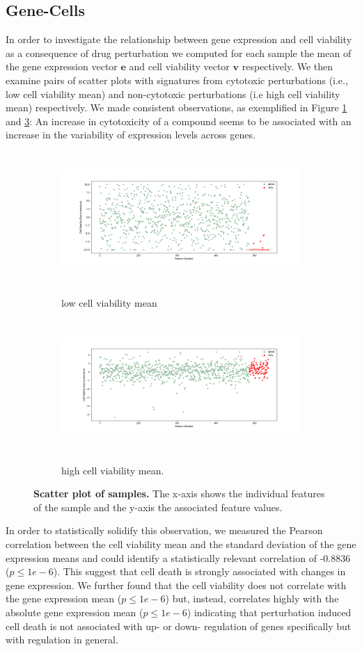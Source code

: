 \documentclass[bsc,frontabs,twoside,singlespacing,parskip,deptreport]{infthesis}     %
\let\Oldsubsection\subsection
\renewcommand{\subsection}{\FloatBarrier\Oldsubsection}
\begin{document}
\subsection{Gene-Cells}
In order to investigate the relationship between gene expression and cell viability as a consequence of drug perturbation we computed for each sample the mean of the gene expression vector \(\mathbf{e}\) and cell viability vector \(\mathbf{v}\) respectively. We then examine pairs of scatter plots with signatures from cytotoxic perturbations (i.e., low cell viability mean) and non-cytotoxic perturbations (i.e high cell viability mean) respectively. We made consistent observations, as exemplified in Figure \ref{low_mean} and \ref{high_mean}: An increase in cytotoxicity of a compound  seems to be associated with an increase in the variability of expression levels across genes.
\begin{figure}[h!]
\centering
\begin{subfigure}{1\textwidth}
 \centering
\caption{low cell viability mean}
\includegraphics[height=5cm]{images/low_cell_mean.png}\label{low_mean}
\end{subfigure}
\begin{subfigure}{1\textwidth}
\centering
\caption{high cell viability mean.}
\includegraphics[height=5cm]{images/high_cell_mean.png}\label{high_mean}
\end{subfigure}
\caption{\textbf{Scatter plot of samples.} The x-axis shows the individual features of the sample and the y-axis the associated feature values.}
\end{figure}
\clearpage
In order to statistically solidify this observation, we  measured the Pearson correlation between the cell viability mean and the standard deviation of the gene expression means and could identify a statistically relevant correlation of -0.8836 (\(p\leq1e-6\)). This suggest that cell death is strongly associated with changes in gene expression.
We further found that the cell viability does not correlate with the gene expression mean (\(p\leq1e-6\)) but, instead, correlates highly with the absolute gene expression mean (\(p\leq1e-6\)) indicating that perturbation induced cell death is not associated with up- or down- regulation of genes specifically but with regulation in general. 
\end{document}
